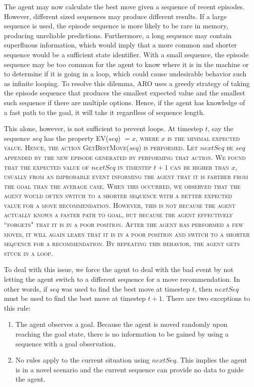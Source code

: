 \documentclass[letterpaper]{article} %
\begin{document}
The agent may now calculate the best move given a sequence of recent
episodes. However, different sized sequences may produce different
results. If a large sequence is used, the episode sequence is more
likely to be rare in memory, producing unreliable
predictions. Furthermore, a long sequence may contain superfluous
information, which would imply that a more common and shorter sequence
would be a sufficient state identifier. With a small sequence, the
episode sequence may be too common for the agent to know where it is
in the machine or to determine if it is going in a loop, which could
cause undesirable behavior such as infinite looping. To resolve this
dilemma, ARO uses a greedy strategy of taking the episode sequence
that produces the smallest expected value and the smallest such sequence
if there are multiple options. Hence, if the agent has
knowledge of a fast path to the goal, it will take it regardless of
sequence length.

This alone, however, is not sufficient to prevent loops. At timestep
$t$, say the sequence $seq$ has the property \scshape
EV\normalfont($seq$) $ = x$, where $x$ is the minimal expected
value. Hence, the action \scshape GetBestMove\normalfont($seq$) is
performed. Let $nextSeq$ be $seq$ appended by the new episode
generated by performing that action. We found that the expected value
of $nextSeq$ in timestep $t+ 1$ can be higher than $x$, usually from
an improbable event informing the agent that it is farther from the
goal than the average case. When this occurred, we observed that the
agent would often switch to a shorter sequence with a better expected
value for a move recommendation. However, this is not because the
agent actually knows a faster path to goal, but because the agent
effectively ``forgets" that it is in a poor position. After the agent
has performed a few moves, it will again learn that it is in a poor
position and switch to a shorter sequence for a recommendation. By
repeating this behavior, the agent gets stuck in a loop.

To deal with this issue, we force the agent to deal with the bad event
by not letting the agent switch to a different sequence for a move
recommendation. In other words, if $seq$ was used to find the best
move at timestep $t$, then $nextSeq$ must be used to find the best
move at timestep $t+1$. There are two exceptions to this rule:
\begin{enumerate}
	\item The agent observes a goal. Because the agent is moved randomly upon reaching the goal state, there is no information to be gained by using a sequence with a goal observation.
	\item No rules apply to the current situation using $nextSeq$. This implies the agent is in a novel scenario and the current sequence can provide no data to guide the agent.
\end{enumerate}
\end{document}
